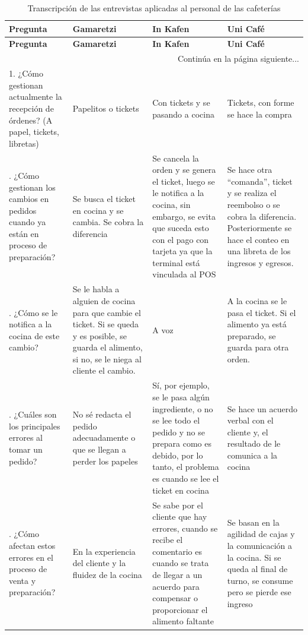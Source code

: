 \begin{longtable}[c]{p{3cm} p{4cm} p{4cm} p{4cm}}
\caption{Transcripción de las entrevistas aplicadas al personal de las cafeterías} \label{tab:transcripcion-entrevistas} \\
\toprule
\textbf{Pregunta} & \textbf{Gamaretzi} & \textbf{In Kafen} & \textbf{Uni Café} \\
\midrule
\endfirsthead

\toprule
\textbf{Pregunta} & \textbf{Gamaretzi} & \textbf{In Kafen} & \textbf{Uni Café} \\
\midrule
\endhead

\midrule
\multicolumn{4}{r}{\small Continúa en la página siguiente...} \\
\endfoot
\bottomrule
\endlastfoot

1. ¿Cómo gestionan actualmente la recepción de órdenes? (A papel, tickets, libretas) & Papelitos o tickets & Con tickets y se pasando a cocina & Tickets, con forme se hace la compra \\
\addlinespace
2. ¿Cómo gestionan los cambios en pedidos cuando ya están en proceso de preparación? & Se busca el ticket en cocina y se cambia. Se cobra la diferencia & Se cancela la orden y se genera el ticket, luego se le notifica a la cocina, sin embargo, se evita que suceda esto con el pago con tarjeta ya que la terminal está vinculada al POS & Se hace otra ``comanda'', ticket y se realiza el reembolso o se cobra la diferencia. Posteriormente se hace el conteo en una libreta de los ingresos y egresos. \\
\addlinespace
3. ¿Cómo se le notifica a la cocina de este cambio? & Se le habla a alguien de cocina para que cambie el ticket. Si se queda y es posible, se guarda el alimento, si no, se le niega al cliente el cambio. & A voz & A la cocina se le pasa el ticket. Si el alimento ya está preparado, se guarda para otra orden. \\
\addlinespace
4. ¿Cuáles son los principales errores al tomar un pedido? & No sé redacta el pedido adecuadamente o que se llegan a perder los papeles & Sí, por ejemplo, se le pasa algún ingrediente, o no se lee todo el pedido y no se prepara como es debido, por lo tanto, el problema es cuando se lee el ticket en cocina & Se hace un acuerdo verbal con el cliente y, el resultado de le comunica a la cocina \\
\addlinespace
5. ¿Cómo afectan estos errores en el proceso de venta y preparación? & En la experiencia del cliente y la fluidez de la cocina & Se sabe por el cliente que hay errores, cuando se recibe el comentario es cuando se trata de llegar a un acuerdo para compensar o proporcionar el alimento faltante & Se basan en la agilidad de cajas y la comunicación a la cocina. Si se queda al final de turno, se consume pero se pierde ese ingreso \\

\end{longtable}
